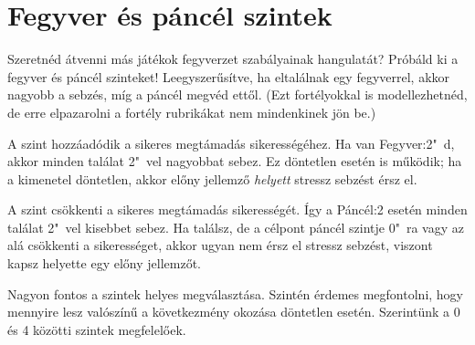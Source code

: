 \label{Fegyver és páncél szintek}
\section{Fegyver és páncél szintek}

Szeretnéd átvenni más játékok fegyverzet szabályainak hangulatát? Próbáld ki a fegyver és páncél szinteket! Leegyszerűsítve, ha eltalálnak egy fegyverrel, akkor nagyobb a sebzés, míg a páncél megvéd ettől. (Ezt fortélyokkal is modellezhetnéd, de erre elpazarolni a fortély rubrikákat nem mindenkinek jön be.)

A  szint hozzáadódik a sikeres megtámadás sikerességéhez. Ha van Fegyver:2"~d, akkor minden találat 2"~vel nagyobbat sebez. Ez döntetlen esetén is működik; ha a kimenetel döntetlen, akkor előny jellemző \emph{helyett} stressz sebzést érsz el.

A  szint csökkenti a sikeres megtámadás sikerességét. Így a Páncél:2 esetén minden találat 2"~vel kisebbet sebez. Ha találsz, de a célpont páncél szintje 0"~ra vagy az alá csökkenti a sikerességet, akkor ugyan nem érsz el stressz sebzést, viszont kapsz helyette egy előny jellemzőt.

Nagyon fontos a szintek helyes megválasztása. Szintén érdemes megfontolni, hogy mennyire lesz valószínű a következmény okozása döntetlen esetén. Szerintünk a 0 és 4 közötti szintek megfelelőek.

